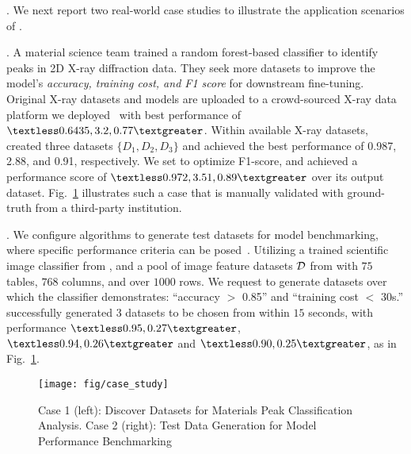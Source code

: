 \vspace{1ex}
. We next report two real-world case studies to illustrate the application scenarios of \modis. 

. A material science team trained a random forest-based classifier to identify peaks in 2D X-ray diffraction data. They seek more datasets to improve the model's {\em accuracy, training cost, and F1 score} for downstream fine-tuning. Original X-ray datasets and models are uploaded to a crowd-sourced X-ray data platform we deployed~\cite{wang2022crux} with 
best performance of $\textless0.6435, 3.2, 0.77\textgreater$.
Within available X-ray datasets, \bimodis created three datasets $\{D_1, D_2, D_3\}$ and achieved the best  performance of 0.987, 2.88, and 0.91, respectively. We set \metam to optimize F1-score, and achieved a performance score of $\textless 0.972, 3.51, 0.89\textgreater$ over its output dataset.
Fig.~\ref{fig:cases} illustrates 
such a case that is manually validated with ground-truth from 
a third-party institution. 


. 
We configure \modis algorithms to generate test datasets for model benchmarking, where specific performance criteria can be posed~\cite{ventura2021expand}. Utilizing a trained scientific image classifier from \kaggle, and a pool of image feature datasets ${\mathcal D}$ from \hf with $75$ tables, $768$ columns, and over $1000$ rows. 
We request \bimodis to generate  
datasets over which the classifier demonstrates: ``accuracy $>$ 0.85'' and ``training cost $<$ 30s.'' 
\bimodis successfully generated $3$ datasets to be chosen from within $15$ seconds, with performance $\textless0.95, 0.27\textgreater$, $\textless0.94, 0.26\textgreater$ and $\textless0.90, 0.25\textgreater$, as in Fig.~\ref{fig:cases}.


\begin{figure}[tb!]
\centerline{\texttt{[image: fig/case\_study]}}
\centering
\caption{Case 1 (left): Discover Datasets for Materials Peak Classification Analysis. Case 2 (right): Test Data Generation for Model Performance Benchmarking}
\vspace{-2ex}
\label{fig:cases}
\end{figure}



